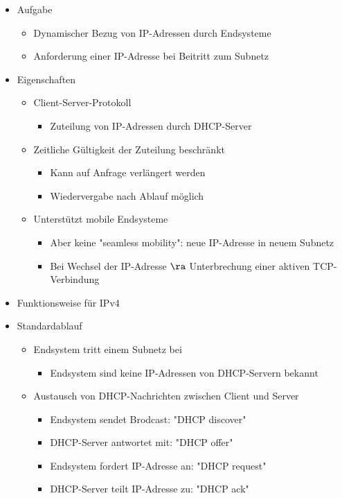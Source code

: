       \begin{itemize}
        \item Aufgabe
          \begin{itemize}
            \item Dynamischer Bezug von IP-Adressen durch Endsysteme
            \item Anforderung einer IP-Adresse bei Beitritt zum Subnetz
          \end{itemize}
        \item Eigenschaften
          \begin{itemize}
            \item Client-Server-Protokoll
              \begin{itemize}
                \item Zuteilung von IP-Adressen durch DHCP-Server
              \end{itemize}
            \item Zeitliche Gültigkeit der Zuteilung beschränkt
              \begin{itemize}
                \item Kann auf Anfrage verlängert werden
                \item Wiedervergabe nach Ablauf möglich
              \end{itemize}
            \item Unterstützt mobile Endsysteme
              \begin{itemize}
                \item Aber keine "seamless mobility": neue IP-Adresse in neuem Subnetz
                \item Bei Wechsel der IP-Adresse $\ra$ Unterbrechung einer aktiven TCP-Verbindung
              \end{itemize}
          \end{itemize}
        \item Funktionsweise für IPv4
        \item Standardablauf
          \begin{itemize}
            \item Endsystem tritt einem Subnetz bei
              \begin{itemize}
                \item Endsystem sind keine IP-Adressen von DHCP-Servern bekannt
              \end{itemize}
            \item Austausch von DHCP-Nachrichten zwischen Client und Server
              \begin{itemize}
                \item Endsystem sendet Brodcast: "DHCP discover"
                \item DHCP-Server antwortet mit: "DHCP offer"
                \item Endsystem fordert IP-Adresse an: "DHCP request"
                \item DHCP-Server teilt IP-Adresse zu: "DHCP ack"
              \end{itemize}
          \end{itemize}
      \end{itemize}
